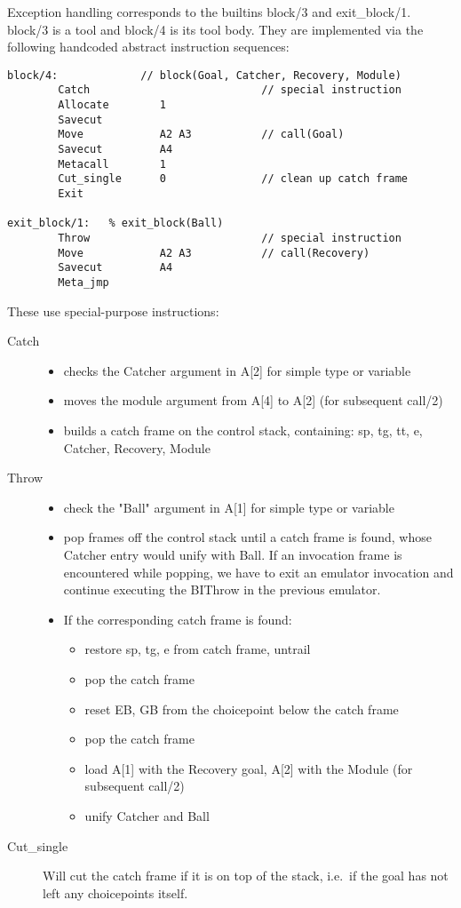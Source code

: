 Exception handling corresponds to the builtins block/3 and exit_block/1.
block/3 is a tool and block/4 is its tool body.
They are implemented via the following handcoded abstract instruction
sequences:
\begin{verbatim}
block/4:             // block(Goal, Catcher, Recovery, Module)
        Catch                           // special instruction
        Allocate        1
        Savecut
        Move            A2 A3           // call(Goal)
        Savecut         A4
        Metacall        1
        Cut_single      0               // clean up catch frame
        Exit

exit_block/1:   % exit_block(Ball)
        Throw                           // special instruction
        Move            A2 A3           // call(Recovery)
        Savecut         A4
        Meta_jmp
\end{verbatim}
These use special-purpose instructions:
\begin{description}
\item[Catch] 
    \begin{itemize}
    \item checks the Catcher argument in A[2] for simple type or variable
    \item moves the module argument from A[4] to A[2] (for subsequent call/2)
    \item builds a catch frame on the control stack, containing:
                sp, tg, tt, e, Catcher, Recovery, Module
    \end{itemize}
\item[Throw] 
    \begin{itemize}
    \item check the "Ball" argument in A[1] for simple type or variable
    \item pop frames off the control stack until a catch frame is found, whose
          Catcher entry would unify with Ball.
          If an invocation frame is encountered while popping, we have to exit
          an emulator invocation and continue executing the BIThrow in the
          previous emulator.
    \item If the corresponding catch frame is found:
        \begin{itemize}
        \item restore sp, tg, e from catch frame, untrail
        \item pop the catch frame
        \item reset EB, GB from the choicepoint below the catch frame
        \item pop the catch frame
        \item load A[1] with the Recovery goal, A[2] with the Module
          (for subsequent call/2)
        \item unify Catcher and Ball
        \end{itemize}
    \end{itemize}
\item[Cut_single] 
    Will cut the catch frame if it is on top of the stack, i.e.\ if the
    goal has not left any choicepoints itself.
\end{description}
